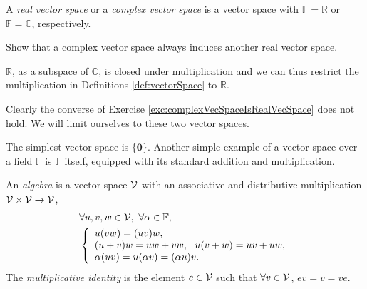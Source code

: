\begin{defn}
  \label{def:vectorSpacesRandC}
  A \emph{real vector space}
  or a \emph{complex vector space} is
  a vector space with $\mathbb{F}=\mathbb{R}$
  or $\mathbb{F}=\mathbb{C}$,
  respectively.
\end{defn}

\begin{exc}
  \label{exc:complexVecSpaceIsRealVecSpace}
  Show that a complex vector space
  always induces another real vector space.
\end{exc}
\begin{solution}
  $\mathbb{R}$, as a subspace of $\mathbb{C}$, 
  is closed under multiplication
  and we can thus restrict the multiplication
  in Definitions \ref{def:vectorSpace} to $\mathbb{R}$.
\end{solution}

\begin{rem}
  Clearly the converse of Exercise
  \ref{exc:complexVecSpaceIsRealVecSpace}
  does not hold.
  We will limit ourselves to these two vector spaces.
\end{rem}

\begin{exm}
  The simplest vector space is $\{\mathbf{0}\}$.
  Another simple example of a vector space over a field $\mathbb{F}$
  is $\mathbb{F}$ itself,
  equipped with its standard addition and multiplication.
\end{exm}

\begin{defn}
  \label{def:algebra}
  An \emph{algebra} is a vector space ${\cal V}$
  with an associative and distributive multiplication
  ${\cal V}\times {\cal V} \rightarrow {\cal V}$, 
  \begin{align}\nonumber
    &\forall u,v,w\in {\cal V},\ \forall \alpha\in \mathbb{F},
    \\ \label{eq:algebra}
    &\left\{
      \begin{array}{l}
        u(vw) = (uv)w,
        \\
        (u+v)w = uw + vw,\ \ 
        u(v+w) = uv + uw,
        \\
        \alpha(uv) = u(\alpha v) = (\alpha u) v.
      \end{array}
    \right.
  \end{align}
  The \emph{multiplicative identity}
  is the element $e\in {\cal V}$ such that
  $\forall v\in {\cal V}$, $ev=v=ve$.
\end{defn}


